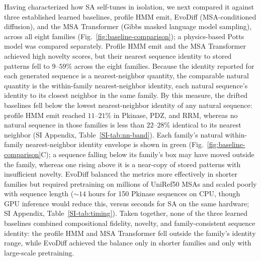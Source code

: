 \documentclass[11pt,onecolumn,twoside,lineno]{pnas-new}
\begin{document}
Having characterized how SA self-tunes in isolation, we next compared it against three established learned baselines, profile HMM emit, EvoDiff (MSA-conditioned diffusion), and the MSA Transformer (Gibbs masked language model sampling), across all eight families (Fig.~\ref{fig:baseline-comparison}); a physics-based Potts model was compared separately. Profile HMM emit and the MSA Transformer achieved high novelty scores, but their nearest sequence identity to stored patterns fell to $9$--$59\%$ across the eight families. Because the identity reported for each generated sequence is a nearest-neighbor quantity, the comparable natural quantity is the within-family nearest-neighbor identity, each natural sequence's identity to its closest neighbor in the same family. By this measure, the drifted baselines fell below the lowest nearest-neighbor identity of any natural sequence: profile HMM emit reached $11$--$21\%$ in Pkinase, PDZ, and RRM, whereas no natural sequence in those families is less than $22$--$28\%$ identical to its nearest neighbor (SI Appendix, Table~\ref{SI-tab:nn-band}). Each family's natural within-family nearest-neighbor identity envelope is shown in green (Fig.~\ref{fig:baseline-comparison}C); a sequence falling below its family's box may have moved outside the family, whereas one rising above it is a near-copy of stored patterns with insufficient novelty. EvoDiff balanced the metrics more effectively in shorter families but required pretraining on millions of UniRef50 MSAs and scaled poorly with sequence length (${\sim}14$ hours for 150 Pkinase sequences on CPU, though GPU inference would reduce this, versus seconds for SA on the same hardware; SI Appendix, Table~\ref{SI-tab:timing}). Taken together, none of the three learned baselines combined compositional fidelity, novelty, and family-consistent sequence identity: the profile HMM and MSA Transformer fell outside the family's identity range, while EvoDiff achieved the balance only in shorter families and only with large-scale pretraining.
\end{document}
